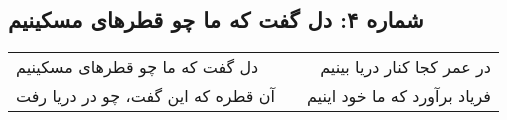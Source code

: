 \begin{center}
\section*{شماره ۴: دل گفت که ما چو قطرهای مسکینیم}
\label{sec:004}
\begin{longtable}{l p{0.5cm} r}
دل گفت که ما چو قطرهای مسکینیم
&&
در عمر کجا کنار دریا بینیم
\\
آن قطره که این گفت، چو در دریا رفت
&&
فریاد برآورد که ما خود اینیم
\\
\end{longtable}
\end{center}
